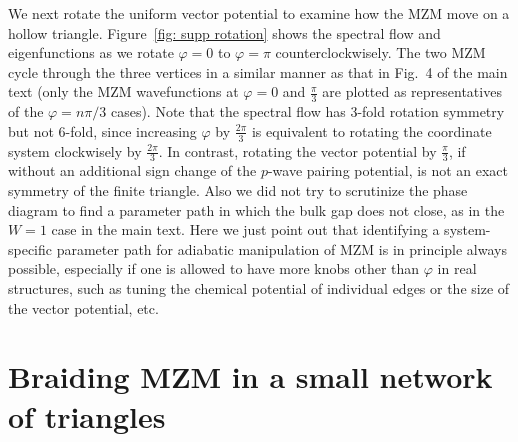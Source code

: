We next rotate the uniform vector potential to examine how the MZM move on a hollow triangle. Figure~\ref{fig: supp rotation} shows the spectral flow and eigenfunctions as we rotate $\varphi=0$ to $\varphi=\pi$ counterclockwisely. The two MZM cycle through the three vertices in a similar manner as that in Fig.~4 of the main text (only the MZM wavefunctions at $\varphi = 0$ and $\frac{\pi}{3}$ are plotted as representatives of the $\varphi = n\pi/3$ cases). Note that the spectral flow has 3-fold rotation symmetry but not 6-fold, since increasing $\varphi$ by $\frac{2\pi}{3}$ is equivalent to rotating the coordinate system clockwisely by $\frac{2\pi}{3}$. In contrast, rotating the vector potential by $\frac{\pi}{3}$, if without an additional sign change of the $p$-wave pairing potential, is not an exact symmetry of the finite triangle. Also we did not try to scrutinize the phase diagram to find a parameter path in which the bulk gap does not close, as in the $W=1$ case in the main text. Here we just point out that identifying a system-specific parameter path for adiabatic manipulation of MZM is in principle always possible, especially if one is allowed to have more knobs other than $\varphi$ in real structures, such as tuning the chemical potential of individual edges or the size of the vector potential, etc.

\section{Braiding MZM in a small network of triangles}

